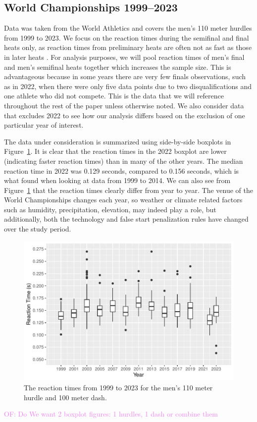 \documentclass[12pt, letterpaper]{article}
\newcommand{\of}[1]{\textcolor{violet}{OF: #1}}
\begin{document}
\subsection{World Championships 1999--2023}\label{sec:dataworld}


Data was taken from the World Athletics 
and covers the men's 110 meter hurdles from 1999 to 2023.
We focus on the reaction times during the 
semifinal and final heats only, as reaction times from preliminary heats are 
often not as fast as those in later heats \citep[e.g.,][]{zhang2021correlation}. 
For analysis purposes, we will pool reaction times of men's final and 
men's semifinal heats together which increases the sample size. This is 
advantageous because in some years there are very few finals observations, such
as in 2022, when there were only five data points due to two disqualifications 
and one athlete who did not compete. This is the data that we will reference
throughout the rest of the paper unless otherwise noted. We also consider data 
that excludes 2022 to see how our analysis differs based on the exclusion of one
particular year of interest.


The data under consideration is summarized using side-by-side boxplots in 
Figure~\ref{fig:Boxplot}. It is clear that the reaction times in the 2022
boxplot are lower (indicating faster reaction times) than in many of the other
years. The median reaction time in 2022 was 0.129 seconds,  compared to 0.156
seconds, which is what \citet{brosnan2017effects} found when looking at data
from 1999 to 2014. We can also see from Figure~\ref{fig:Boxplot} that the 
reaction times clearly differ from year to year. The venue of the World 
Championships changes each year, so weather or climate related factors such as 
humidity, precipitation, elevation, may indeed play a role, but additionally,
both the technology and false start penalization rules have changed over the 
study period.


\begin{figure}[tbp]
  \centering
  \includegraphics{Boxplot}
  \caption{The reaction times from 1999 to 2023 for the men's 110 meter hurdle
  and 100 meter dash.}
  \label{fig:Boxplot}
\end{figure}
\of{Do We want 2 boxplot figures: 1 hurdles, 1 dash or combine them}
\end{document}

